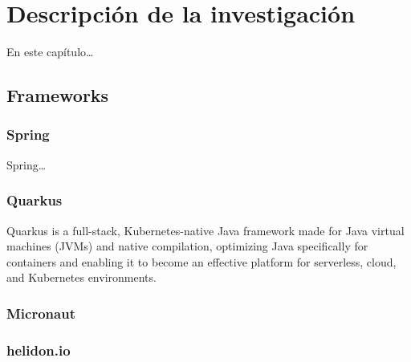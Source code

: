 \chapter{Descripción de la investigación}

En este capítulo\dots

\section{Frameworks}



\subsection{Spring}

Spring\dots

\subsection{Quarkus}
Quarkus is a full-stack, Kubernetes-native Java framework made for Java virtual machines (JVMs) and native compilation, optimizing Java specifically for containers and enabling it to become an effective platform for serverless, cloud, and Kubernetes environments.

\subsection{Micronaut}



\subsection{helidon.io}

